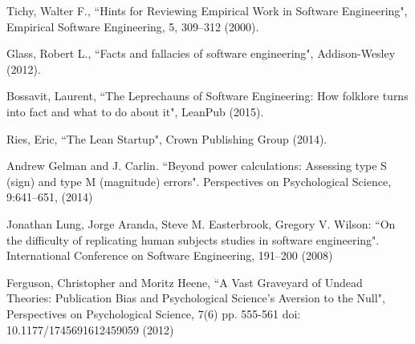\documentclass{svjour3}                     %
\begin{document}
\begin{thebibliography}{}

 Tichy, Walter F., ``Hints for Reviewing Empirical Work in Software Engineering", Empirical Software Engineering, 5, 309--312 (2000).

 Glass, Robert L., ``Facts and fallacies of software engineering", Addison-Wesley (2012).

 Bossavit, Laurent, ``The Leprechauns of Software Engineering: How folklore turns into fact and what to do about it", LeanPub (2015).

 Ries, Eric, ``The Lean Startup", Crown Publishing Group (2014).

 Andrew Gelman and J. Carlin. ``Beyond power calculations: Assessing type S (sign) and type M (magnitude) errors". Perspectives on Psychological Science, 9:641–651, (2014)


 Jonathan Lung, Jorge Aranda, Steve M. Easterbrook, Gregory V. Wilson: ``On the difficulty of replicating human subjects studies in software engineering". International Conference on Software Engineering, 191--200 (2008)

 Ferguson, Christopher and Moritz Heene, ``A Vast Graveyard of Undead Theories: Publication Bias and Psychological Science's Aversion to the Null",  Perspectives on Psychological Science, 7(6) pp. 555-561 doi: 10.1177/1745691612459059 (2012)
\end{thebibliography}
\end{document}
